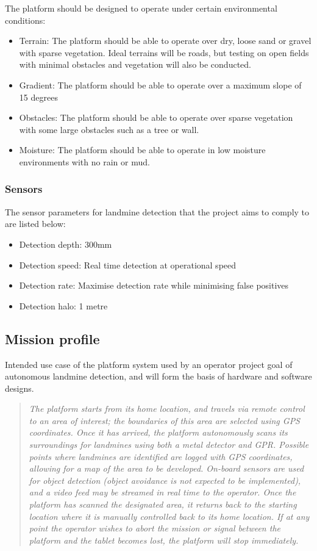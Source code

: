 \documentclass[main.tex]{subfiles}
\begin{document}
The platform should be designed to operate under certain environmental conditions:
\begin{itemize}
\item Terrain: The platform should be able to operate over dry, loose sand or gravel with sparse vegetation. Ideal terrains will be roads, but testing on open fields with minimal obstacles and vegetation will also be conducted.
\item Gradient: The platform should be able to operate over a maximum slope of 15 degrees
\item Obstacles: The platform should be able to operate over sparse vegetation with some large obstacles such as a tree or wall.
\item Moisture: The platform should be able to operate in low moisture environments with no rain or mud.
\end{itemize}
\subsubsection{Sensors}
The sensor parameters for landmine detection that the project aims to comply to are listed below:
\begin{itemize}
\item Detection depth: 300mm 
\item Detection speed: Real time detection at operational speed
\item Detection rate: Maximise detection rate while minimising false positives
\item Detection halo: 1 metre
\end{itemize}

\subsection{Mission profile}
%
%
Intended use case of the platform
system used by an operator 
project goal of autonomous landmine detection, and will form the basis of hardware and software designs.
\begin{quote}\textit{The platform starts from its home location, and travels via remote control to an area of interest; the boundaries of this area are selected using GPS coordinates. Once it has arrived, the platform autonomously scans its surroundings for landmines using both a metal detector and GPR. Possible points where landmines are identified are logged with GPS coordinates, allowing for a map of the area to be developed. On-board sensors are used for object detection (object avoidance is not expected to be implemented), and a video feed may be streamed in real time to the operator. Once the platform has scanned the designated area, it returns back to the starting location where it is manually controlled back to its home location. If at any point the operator wishes to abort the mission or signal between the platform and the tablet becomes lost, the platform will stop immediately.}
\end{quote}
\end{document}
